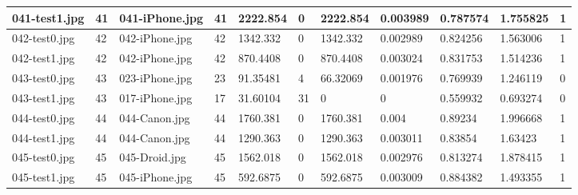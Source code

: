 \begin{landscape}
\begin{longtable}{|p{2cm}|p{1cm}|p{2cm}|p{1cm}|p{2cm}|p{1cm}|p{2cm}|p{2cm}|p{2cm}|p{2cm}|p{1cm}|}
		041-test1.jpg   & 41               & 041-iPhone.jpg        & 41                          & 2222.854              & 0                       & 2222.854                   & 0.003989              & 0.787574              & 1.755825                 & 1                \\ \hline
		042-test0.jpg   & 42               & 042-iPhone.jpg        & 42                          & 1342.332              & 0                       & 1342.332                   & 0.002989              & 0.824256              & 1.563006                 & 1                \\ \hline
		042-test1.jpg   & 42               & 042-iPhone.jpg        & 42                          & 870.4408              & 0                       & 870.4408                   & 0.003024              & 0.831753              & 1.514236                 & 1                \\ \hline
		043-test0.jpg   & 43               & 023-iPhone.jpg        & 23                          & 91.35481              & 4                       & 66.32069                   & 0.001976              & 0.769939              & 1.246119                 & 0                \\ \hline
		043-test1.jpg   & 43               & 017-iPhone.jpg        & 17                          & 31.60104              & 31                      & 0                          & 0                     & 0.559932              & 0.693274                 & 0                \\ \hline
		044-test0.jpg   & 44               & 044-Canon.jpg         & 44                          & 1760.381              & 0                       & 1760.381                   & 0.004                 & 0.89234               & 1.996668                 & 1                \\ \hline
		044-test1.jpg   & 44               & 044-Canon.jpg         & 44                          & 1290.363              & 0                       & 1290.363                   & 0.003011              & 0.83854               & 1.63423                  & 1                \\ \hline
		045-test0.jpg   & 45               & 045-Droid.jpg         & 45                          & 1562.018              & 0                       & 1562.018                   & 0.002976              & 0.813274              & 1.878415                 & 1                \\ \hline
		045-test1.jpg   & 45               & 045-iPhone.jpg        & 45                          & 592.6875              & 0                       & 592.6875                   & 0.003009              & 0.884382              & 1.493355                 & 1                \\ \hline

\end{longtable}
\end{landscape}
